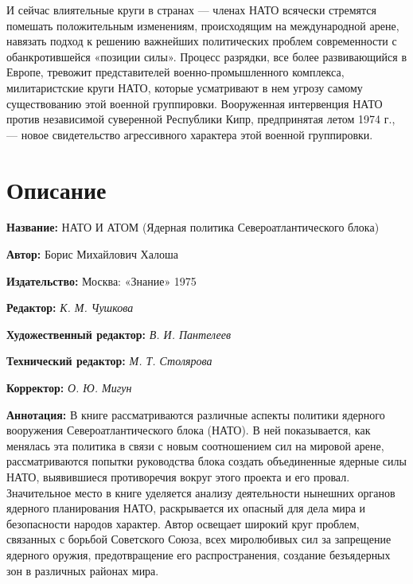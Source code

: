 \documentclass[12pt, a4paper, openany]{book}
\begin{document}
И сейчас влиятельные круги в странах — членах НАТО всячески стремятся помешать положительным изменениям, происходящим на международной арене, навязать подход к решению важнейших политических проблем современности с обанкротившейся «позиции силы». Процесс разрядки, все более развивающийся в Европе, тревожит представителей военно-промышленного комплекса, милитаристские круги НАТО, которые усматривают в нем угрозу самому   существованию этой военной группировки. Вооруженная интервенция НАТО против независимой суверенной Республики Кипр, предпринятая летом 1974 г., — новое свидетельство   агрессивного характера этой военной группировки.

	
	\newpage
	\tableofcontents
	
	\thispagestyle{empty} %
	
	\newpage
	
	\setcounter{secnumdepth}{0}  
	
	
		\section*{Описание}
	
	{\bf Название:} НАТО И АТОМ  (Ядерная политика Североатлантического блока) 
	
{\bf Автор:} Борис Михайлович Халоша
	
{\bf Издательство:} Москва: «Знание» 1975
	
		{\bf Редактор:} \textit{К. М. Чушкова}
	
		{\bf Художественный редактор:} \textit{В. И. Пантелеев}
	
		{\bf Технический редактор:} \textit{М. Т. Столярова}
	
		{\bf Корректор:} \textit{О. Ю. Мигун}
	
		{\bf Аннотация:} В книге рассматриваются различные аспекты политики ядерного вооружения Североатлантического блока (НАТО). В ней показывается, как менялась эта политика в связи с новым  соотношением сил на мировой арене, рассматриваются попытки руководства блока создать объединенные ядерные силы НАТО, выявившиеся противоречия вокруг этого проекта и его провал. Значительное место в книге уделяется анализу деятельности нынешних органов ядерного планирования НАТО, раскрывается их опасный для дела мира и безопасности народов характер. Автор освещает широкий круг проблем, связанных с борьбой Советского Союза, всех миролюбивых сил за запрещение ядерного оружия, предотвращение его распространения, создание безъядерных зон в различных районах мира. 
		\thispagestyle{empty} %

	
\end{document}
